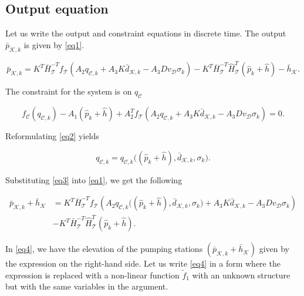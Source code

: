 


\frontmatter
{}

\subsection{Output equation}

Let us write the output and constraint equations in discrete time. The output $\bar{p}_{\mathcal{K},k}$ is given by \eqref{eq1}.

\begin{equation}
  \label{eq1}
  \bar{p}_{\mathcal{K},k} = K^T \bar{H}^{-T}_{\mathcal{T}}f_{\mathcal{T}}(A_2 q_{\mathcal{C},k} + A_3 K \bar{d}_{\mathcal{K},k} - A_3 D v_{\mathcal{D}} \sigma_k) - K^T\bar{H}^{-T}_{\mathcal{T}}\hat{H}^{T}_{\mathcal{T}} (\hat{p}_k + \hat{h}) - \bar{h}_{\mathcal{K}}.
\end{equation}


The constraint for the system is on $q_\mathcal{C}$

 \begin{equation}
\label{eq2}
f_{\mathcal{C}}(q_{\mathcal{C},k}) - A_1(\hat{p}_k + \hat{h}) + A_2^T f_{\mathcal{T}}(A_2 q_{\mathcal{C},k} + A_3 K \bar{d}_{\mathcal{K},k} - A_3 D v_{\mathcal{D}} \sigma_k) = 0.
\end{equation} 

Reformulating \eqref{eq2} yields 

 \begin{equation}
\label{eq3}
q_{\mathcal{C},k} = q_{\mathcal{C},k}\big ((\hat{p}_k + \hat{h}),\bar{d}_{\mathcal{K},k}, \sigma_k \big) .
\end{equation} 

Substituting \eqref{eq3} into \eqref{eq1}, we get the following


\begin{align}
  \label{eq4}
      \bar{p}_{\mathcal{K},k} + \bar{h}_{\mathcal{K}} &= \nonumber K^T \bar{H}^{-T}_{\mathcal{T}}f_{\mathcal{T}}(A_2 q_{\mathcal{C},k}\big ((\hat{p}_k + \hat{h}),\bar{d}_{\mathcal{K},k}, \sigma_k \big) + A_3 K \bar{d}_{\mathcal{K},k} - A_3 D v_{\mathcal{D}} \sigma_k)   \\ &  - K^T\bar{H}^{-T}_{\mathcal{T}}\hat{H}^{T}_{\mathcal{T}} (\hat{p}_k + \hat{h}) .
\end{align}

In \eqref{eq4}, we have the elevation of the pumping stations $(\bar{p}_{\mathcal{K},k} + \bar{h}_{\mathcal{K}})$ given by the expression on the right-hand side. Let us write \eqref{eq4} in a form where the expression is replaced with a non-linear function $\tilde{f}_1$ with an unknown structure but with the same variables in the argument.

